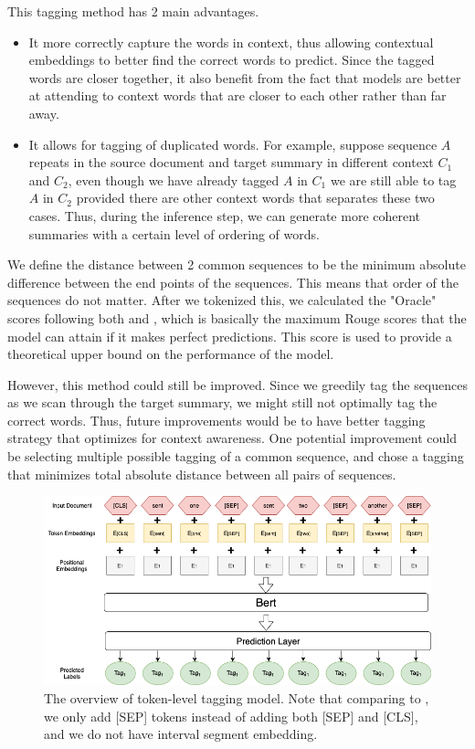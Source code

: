 \documentclass[11pt,a4paper]{article}
\begin{document}
This tagging method has 2 main advantages. 
\begin{itemize}
	\item It more correctly capture the words in context, thus allowing contextual embeddings to better find the correct words to predict. Since the tagged words are closer together, it also benefit from the fact that models are better at attending to context words that are closer to each other rather than far away. 
	\item It allows for tagging of duplicated words. For example, suppose sequence $A$ repeats in the source document and target summary in different context $C_1$ and $C_2$, even though we have already tagged $A$ in $C_1$ we are still able to tag $A$ in $C_2$ provided there are other context words that separates these two cases. Thus, during the inference step, we can generate more coherent summaries with a certain level of ordering of words.
\end{itemize}
We define the distance between 2 common sequences to be the minimum absolute difference between the end points of the sequences. This means that order of the sequences do not matter. After we tokenized this, we calculated the "Oracle" scores following both \citet{bert-sum} and \citet{bottom-up}, which is basically the maximum Rouge scores that the model can attain if it makes perfect predictions. This score is used to provide a theoretical upper bound on the performance of the model.

However, this method could still be improved. Since we greedily tag the sequences as we scan through the target summary, we might still not optimally tag the correct words. Thus, future improvements would be to have better tagging strategy that optimizes for context awareness. One potential improvement could be selecting multiple possible tagging of a common sequence, and chose a tagging that minimizes total absolute distance between all pairs of sequences. 

\begin{figure}[t]
	\centering
	\includegraphics[width=\linewidth]{model}
	\caption{The overview of token-level tagging model. Note that comparing to \citet{bert-sum}, we only add [SEP] tokens instead of adding both [SEP] and [CLS], and we do not have interval segment embedding. }
	\label{fig:overview}
\end{figure}
\end{document}
